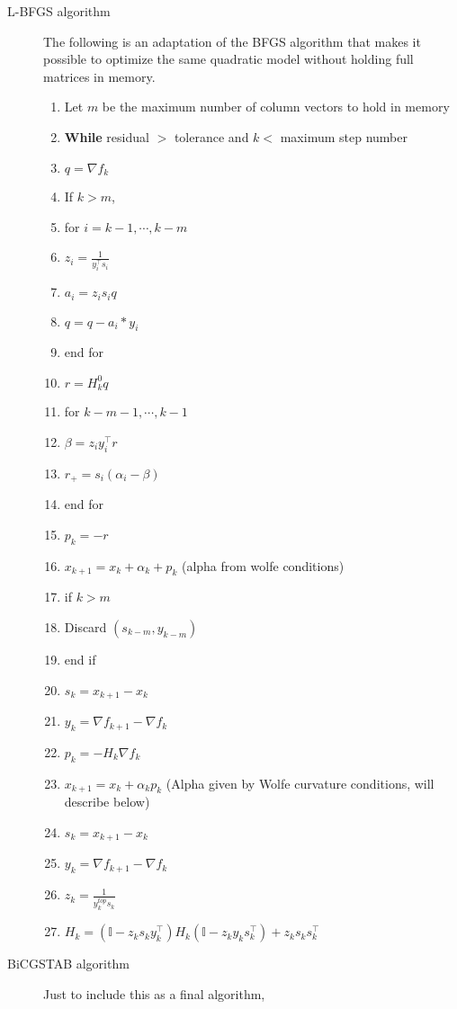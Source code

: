 \begin{description}
{\begin{description}
\item[L-BFGS algorithm]
The following is an adaptation of the BFGS algorithm that makes it possible to optimize the
same quadratic model without holding full matrices in memory.

\begin{enumerate}
\item Let $m$ be the maximum number of column vectors to hold in memory
\item \textbf{While} residual $>$ tolerance and $k<$ maximum step number
\item $q = \nabla f_k$
\item If $k>m$,
\item for $i = k-1 ,\cdots , k-m$
\item $z_i = \frac{1}{y_i^{\top} s_i}$
\item $a_i = z_i s_i q$
\item $q = q - a_i*y_i$
\item end for
\item $r = H_k^{0}q$
\item for $k-m-1,\cdots, k-1$
\item $\beta = z_i y_i^{\top} r$
\item $r_+ = s_i (\alpha_i - \beta)$
\item end for
\item $p_k = -r$
\item $x_{k+1} = x_k + \alpha_k + p_k$ (alpha from wolfe conditions)
\item if $k>m$
\item Discard $(s_{k-m},y_{k-m})$
\item end if
\item $s_k = x_{k+1} - x_k$
\item $y_k = \nabla f_{k+1} - \nabla f_k$
\item $p_k = -H_k \nabla f_k$
\item $x_{k+1} = x_k + \alpha_k p_k$ (Alpha given by Wolfe curvature conditions, will describe below)
\item $s_k = x_{k+1} - x_k$
\item $y_k = \nabla f_{k+1} - \nabla f_{k}$
\item $z_k = \frac{1}{y_k^{top}s_k}$
\item $H_k = (\mathbb{I}-z_k s_k y_k^{\top})H_k(\mathbb{I}-z_k y_k s_k^{\top}) + z_k s_k s_k^{\top}$
\end{enumerate}

\item[BiCGSTAB algorithm]
Just to include this as a final algorithm,


\end{description}}
\end{description}

